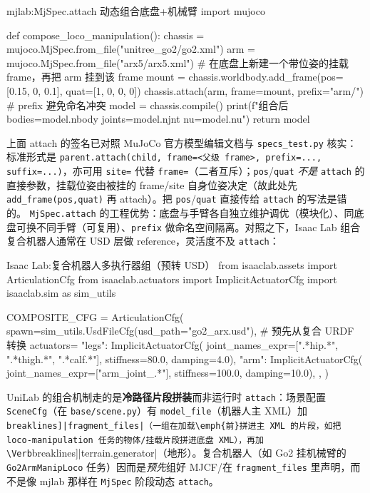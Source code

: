 \begin{codebox}[Python]{mjlab:MjSpec.attach 动态组合底盘+机械臂}
import mujoco

def compose_loco_manipulation():
    chassis = mujoco.MjSpec.from_file("unitree_go2/go2.xml")
    arm = mujoco.MjSpec.from_file("arx5/arx5.xml")
    # 在底盘上新建一个带位姿的挂载 frame，再把 arm 挂到该 frame
    mount = chassis.worldbody.add_frame(pos=[0.15, 0, 0.1], quat=[1, 0, 0, 0])
    chassis.attach(arm, frame=mount, prefix="arm/")   # prefix 避免命名冲突
    model = chassis.compile()
    print(f"组合后 bodies={model.nbody} joints={model.njnt} nu={model.nu}")
    return model
\end{codebox}

上面 attach 的签名已对照 MuJoCo 官方模型编辑文档与 \texttt{specs\_test.\allowbreak py} 核实：标准形式是 \texttt{parent.\allowbreak attach(child, frame=<父级 frame>, prefix=..., suffix=...)}，亦可用 \texttt{site=} 代替 \texttt{frame=}（二者互斥）；\texttt{pos}/\allowbreak\texttt{quat} \emph{不是} \texttt{attach} 的直接参数，挂载位姿由被挂的 frame/site 自身位姿决定（故此处先 \texttt{add\_frame(pos,quat)} 再 attach）。把 \texttt{pos}/\allowbreak\texttt{quat} 直接传给 \texttt{attach} 的写法是错的。 \texttt{MjSpec.\allowbreak attach} 的工程优势：底盘与手臂各自独立维护调优（模块化）、同底盘可换不同手臂（可复用）、\texttt{prefix} 做命名空间隔离。对照之下，Isaac Lab 组合复合机器人通常在 USD 层做 reference，灵活度不及 \texttt{attach}：

\begin{codebox}[Python]{Isaac Lab:复合机器人多执行器组（预转 USD）}
from isaaclab.assets import ArticulationCfg
from isaaclab.actuators import ImplicitActuatorCfg
import isaaclab.sim as sim_utils

COMPOSITE_CFG = ArticulationCfg(
    spawn=sim_utils.UsdFileCfg(usd_path="go2_arx.usd"),  # 预先从复合 URDF 转换
    actuators={
        "legs": ImplicitActuatorCfg(
            joint_names_expr=[".*hip.*", ".*thigh.*", ".*calf.*"],
            stiffness=80.0, damping=4.0),
        "arm": ImplicitActuatorCfg(
            joint_names_expr=["arm_joint_.*"], stiffness=100.0, damping=10.0),
    },
)
\end{codebox}

UniLab 的组合机制走的是\textbf{冷路径片段拼装}而非运行时 \texttt{attach}：场景配置 \texttt{SceneCfg}（在 \verb|base/scene.py|）有 \verb|model_file|（机器人主 XML）加 \Verb[breaklines]|fragment_files|（一组在加载\emph{前}拼进主 XML 的片段，如把 loco-manipulation 任务的物体/挂载片段拼进底盘 XML），再加 \Verb[breaklines]|terrain.generator|（地形）。复合机器人（如 Go2 挂机械臂的 \texttt{Go2ArmManipLoco} 任务）因而是\emph{预先}组好 MJCF/在 \texttt{fragment\_files} 里声明，而不是像 mjlab 那样在 \texttt{MjSpec} 阶段动态 \texttt{attach}。

